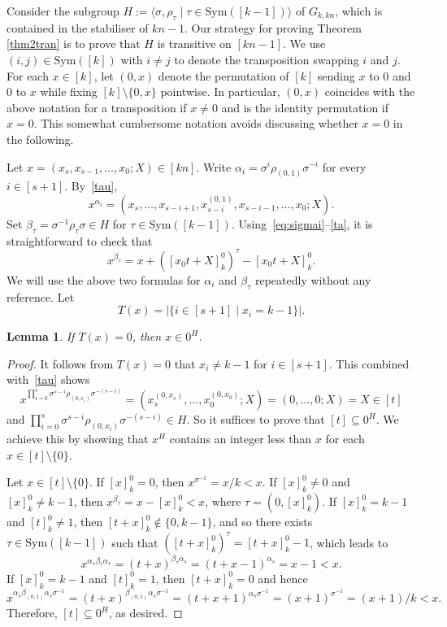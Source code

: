 \documentclass[11pt,a4paper,reqno]{amsart}
\newcommand{\Sym}{\mathrm{Sym}}
\newtheorem{lemma}[theorem]{Lemma}
\theoremstyle{definition}
\begin{document}
Consider the subgroup $H:=\langle\sigma,\rho_{\tau}\mid \tau \in \mathrm{Sym}([k-1])\rangle$ of $G_{k,kn}$,
which is contained in the stabiliser of $kn-1$. Our strategy for proving Theorem \ref{thm2tran} is to prove that $H$ is transitive on $[kn-1]$.
We use $(i,j)\in \Sym([k])$ with $i\neq j$ to denote the transposition swapping $i$ and $j$. For each $x\in[k]$, let $(0,x)$ denote the permutation of $[k]$ sending $x$ to $0$ and $0$ to $x$ while fixing $[k]\setminus \{0,x\}$ pointwise. In particular, $(0,x)$ coincides with the above notation for a transposition if $x\neq 0$ and is the identity permutation if $x=0$. This somewhat cumbersome notation avoids discussing whether $x=0$ in the following.


Let $x=(x_s,x_{s-1},\ldots,x_0;X)\in[kn]$.
Write $\alpha_i=\sigma^{i}\rho_{(0,1)}\sigma^{-i}$ for every $i\in[s+1]$.
By~\eqref{tau},
\begin{equation*}
x^{\alpha_i}
=(x_s,\ldots,x_{s-i+1},x_{s-i}^{(0,1)},x_{s-i-1},\ldots,x_0;X).
\end{equation*}
Set $\beta_{\tau}=\sigma^{-1}\rho_{\tau}\sigma\in H$ for $\tau\in \mathrm{Sym}([k-1])$. Using~\eqref{eq:sigmai}--\eqref{ta}, it is straightforward to check that
\[
x^{\beta_{\tau}}=x+([x_0t+X]_k^0)^{\tau}-[x_0t+X]_k^0.
\]
We will use the above two formulas for $\alpha_i$ and $\beta_{\tau}$ repeatedly without any reference.
Let
\[
  T(x)=|\{i\in[s+1]\mid x_i=k-1\}|.
\]

\begin{lemma}\label{lm:T0}
If $T(x)=0$, then $x\in0^{H}$.
\end{lemma}

\begin{proof}
It follows from $T(x)=0$ that $x_i\neq k-1$ for $i\in[s+1]$. This combined with~\eqref{tau} shows
\[x^{\prod_{i=0}^s\sigma^{s-i}\rho_{(0,x_i)}\sigma^{-(s-i)}}=(x_s^{(0,x_s)},\ldots,x_0^{(0,x_0)};X)=(0,\ldots,0;X)=X\in[t]\]
and $\prod_{i=0}^s\sigma^{s-i}\rho_{(0,x_i)}\sigma^{-(s-i)}\in H$. So it suffices to prove that $[t]\subseteq 0^H$. We achieve this by showing that $x^H$ contains an integer less than $x$ for each $x\in[t]\setminus\{0\}$.

Let $x\in [t]\setminus\{0\}$.
If $[x]_{k}^{0}=0$, then $x^{\sigma^{-1}} = x/k<x$.
If $[x]_{k}^{0}\neq 0$ and $[x]_{k}^{0}\neq k-1$, then $x^{\beta_{\tau}}=x-[x]_k^0<x$, where $\tau=(0,[x]_k^0)$.
If $[x]_{k}^{0}=k-1$ and $[t]_{k}^{0}\neq 1$, then $[t+x]_{k}^{0}\notin\{0,k-1\}$, and so there exists $\tau\in \Sym([k-1])$ such that $([t+x]_{k}^{0})^{\tau}=[t+x]_{k}^{0}-1$, which leads to
\[
 x^{\alpha_{s}\beta_{\tau}\alpha_{s}}=(t+x)^{\beta_{\tau}\alpha_{s}}=(t+x-1)^{\alpha_{s}}= x-1<x.
\]
If $[x]_{k}^{0}=k-1$  and $[t]_{k}^{0}=1$, then $[t+x]_{k}^{0}=0$  and hence
\[
 x^{\alpha_{s}\beta_{(0,1)}\alpha_{s}\sigma^{-1}}= (t+x)^{\beta_{(0,1)}\alpha_{s}\sigma^{-1}}=(t+x+1)^{\alpha_{s}\sigma^{-1}}
=(x+1)^{\sigma^{-1}}=(x+1)/k<x.
\]
Therefore, $[t]\subseteq0^{H}$, as desired.
\end{proof}
\end{document}
